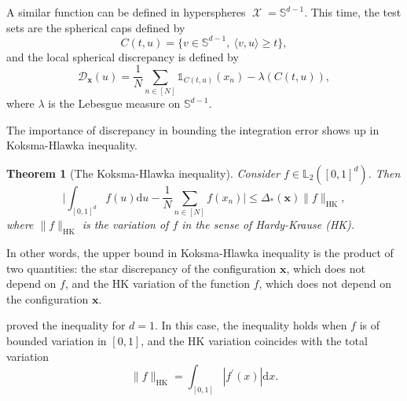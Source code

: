 \documentclass[twoside,11pt]{book}
\newtheorem{theorem}{Theorem}
\numberwithin{theorem}{chapter}
\numberwithin{definition}{chapter}
\numberwithin{proposition}{chapter}
\numberwithin{corollary}{chapter}
\numberwithin{example}{chapter}
\numberwithin{lemma}{chapter}
\DeclareMathOperator{\X}{\mathcal{X}}
\begin{document}
A similar function can be defined in hyperspheres $\X = \mathbb{S}^{d-1}$. This time, the test sets are the spherical caps defined by
\begin{equation}
C(t,u) = \{ v \in \mathbb{S}^{d-1}, \: \langle v, u \rangle \geq t\},
\end{equation}
and the local spherical discrepancy is defined by
\begin{equation}
\mathcal{D}_{\bm{x}}(u) = \frac{1}{N}\sum\limits_{n \in [N]} \mathbb{1}_{C(t,u)}(x_n) - \lambda(C(t,u)),
\end{equation}
where $\lambda$ is the Lebesgue measure on $\mathbb{S}^{d-1}$.


The importance of discrepancy in bounding the integration error shows up in Koksma-Hlawka inequality.


\begin{theorem}[The Koksma-Hlawka inequality]\label{thm:KH_ineq}
Consider $f \in \mathbb{L}_{2}([0,1]^{d})$. Then 
\begin{equation}\label{eq:KH_ineq}
\bigg| \int_{[0,1]^{d}} f(u) \mathrm{d}u - \frac{1}{N} \sum\limits_{n \in [N]}  f(x_{n})\bigg| \leq \Delta_{*}(\bm{x}) \|f\|_{\mathrm{HK}},
\end{equation}
where $\|f\|_{\mathrm{HK}}$ is the variation of $f$ in the sense of Hardy-Krause (HK). 


\end{theorem}

In other words, the upper bound in Koksma-Hlawka inequality is the product of two quantities: the star discrepancy of the configuration $\bm{x}$, which does not depend on $f$, and the HK variation of the function $f$, which does not depend on the configuration $\bm{x}$. 

\cite{Kok42} proved the inequality for $d=1$. In this case, the inequality holds when $f$ is of bounded variation in $[0,1]$, and the HK variation coincides with the total variation
\begin{equation}
\|f\|_{\mathrm{HK}} = \int_{[0,1]}|f^{'}(x)| \mathrm{d}x.
\end{equation}
\end{document}
